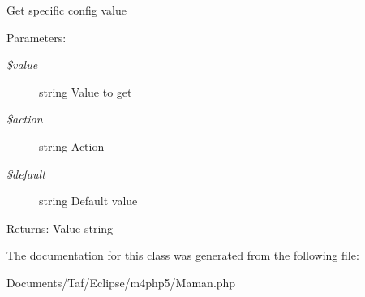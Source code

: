 Get specific config value

\begin{Desc}
\item[Parameters:]
\begin{description}
\item[{\em \$value}]string Value to get \item[{\em \$action}]string Action \item[{\em \$default}]string Default value \end{description}
\end{Desc}
\begin{Desc}
\item[Returns:]Value string \end{Desc}


The documentation for this class was generated from the following file:\begin{CompactItemize}
\item 
Documents/Taf/Eclipse/m4php5/Maman.php\end{CompactItemize}
